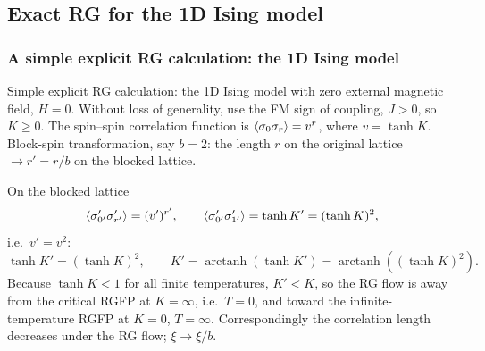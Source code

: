\subsection{Exact RG for the 1D Ising model}
\subsubsection*{A simple explicit RG calculation: the 1D Ising model}

Simple explicit RG calculation: the 1D Ising model with zero external magnetic field, $H = 0$. Without loss
of generality, use the FM sign of coupling, $J>0$, so $K\ge 0$. The spin--spin correlation function is
$\langle \sigma_0\sigma_r\rangle = v^r$, where $v = \tanh K$. Block-spin transformation, say $b = 2$: the length $r$ on
the original lattice $\to r' = r/b$ on the blocked lattice.

\begin{diagram}
\end{diagram}

On the blocked lattice
\begin{equation}
  \langle \sigma_{0'}'\sigma_{r'}'\rangle = (v')^{r'},\qquad
  \langle \sigma_{0'}'\sigma_{1'}'\rangle = \tanh K' = (\tanh K)^2,
\end{equation}
i.e.\ $v' = v^2$:
\begin{equation}
  \tanh K' = (\tanh K)^2,\qquad K' = \operatorname{arctanh}(\tanh K') = \operatorname{arctanh}\left((\tanh K)^2\right).
\end{equation}
Because $\tanh K<1$ for all finite temperatures, $K'<K$, so the RG flow is away from the critical RGFP at
$K = \infty$, i.e.\ $T = 0$, and toward the infinite-temperature RGFP at $K = 0$, $T = \infty$.
Correspondingly the correlation length decreases under the RG flow; $\xi\to\xi/b$.

\begin{diagram}
\end{diagram}

